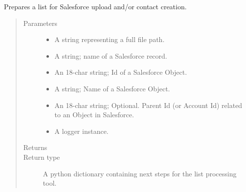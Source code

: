 \documentclass[letterpaper,10pt,english]{sphinxmanual}
\begin{document}
\begin{fulllineitems}
\label{\detokenize{index:ListManagement.utility.processes.source_channel}}
Prepares a list for Salesforce upload and/or contact creation.
\begin{quote}\begin{description}
\item[{Parameters}] \leavevmode\begin{itemize}
\item {} 
 \textendash{} A string representing a full file path.

\item {} 
 \textendash{} A string; name of a Salesforce record.

\item {} 
 \textendash{} An 18-char string; Id of a Salesforce Object.

\item {} 
 \textendash{} A string; Name of a Salesforce Object.

\item {} 
 \textendash{} An 18-char string; Optional. Parent Id (or Account Id) related to an Object in Salesforce.

\item {} 
 \textendash{} A logger instance.

\end{itemize}

\item[{Returns}] \leavevmode


\item[{Return type}] \leavevmode
A python dictionary containing next steps for the list processing tool.

\end{description}\end{quote}

\end{fulllineitems}

\end{document}
